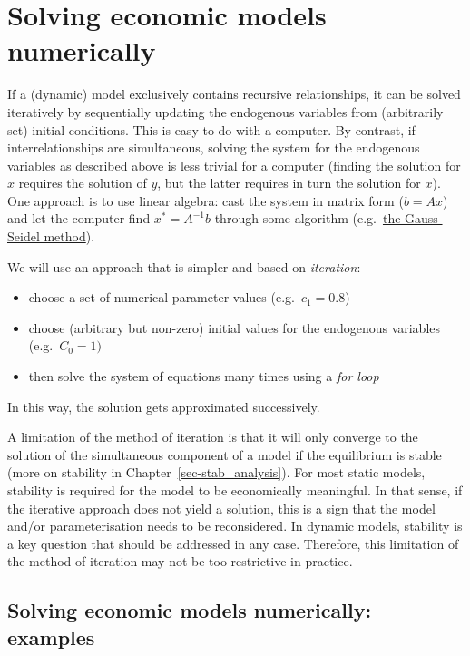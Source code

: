 \documentclass[
  letterpaper,
  DIV=11,
  numbers=noendperiod]{scrreprt}
\begin{document}
\section{Solving economic models
numerically}\label{solving-economic-models-numerically}

If a (dynamic) model exclusively contains recursive relationships, it
can be solved iteratively by sequentially updating the endogenous
variables from (arbitrarily set) initial conditions. This is easy to do
with a computer. By contrast, if interrelationships are simultaneous,
solving the system for the endogenous variables as described above is
less trivial for a computer (finding the solution for \(x\) requires the
solution of \(y\), but the latter requires in turn the solution for
\(x\)). One approach is to use linear algebra: cast the system in matrix
form (\(b=Ax\)) and let the computer find \(x^*=A^{-1}b\) through some
algorithm
(e.g.~\href{https://en.wikipedia.org/wiki/Gauss\%E2\%80\%93Seidel_method}{the
Gauss-Seidel method}).

We will use an approach that is simpler and based on \emph{iteration}:

\begin{itemize}
\item
  choose a set of numerical parameter values (e.g.~\(c_1=0.8\))
\item
  choose (arbitrary but non-zero) initial values for the endogenous
  variables (e.g.~\(C_0=1)\)
\item
  then solve the system of equations many times using a \emph{for loop}
\end{itemize}

In this way, the solution gets approximated successively.

A limitation of the method of iteration is that it will only converge to
the solution of the simultaneous component of a model if the equilibrium
is stable (more on stability in Chapter~\ref{sec-stab_analysis}). For
most static models, stability is required for the model to be
economically meaningful. In that sense, if the iterative approach does
not yield a solution, this is a sign that the model and/or
parameterisation needs to be reconsidered. In dynamic models, stability
is a key question that should be addressed in any case. Therefore, this
limitation of the method of iteration may not be too restrictive in
practice.

\subsection{Solving economic models numerically:
examples}\label{solving-economic-models-numerically-examples}
\end{document}
